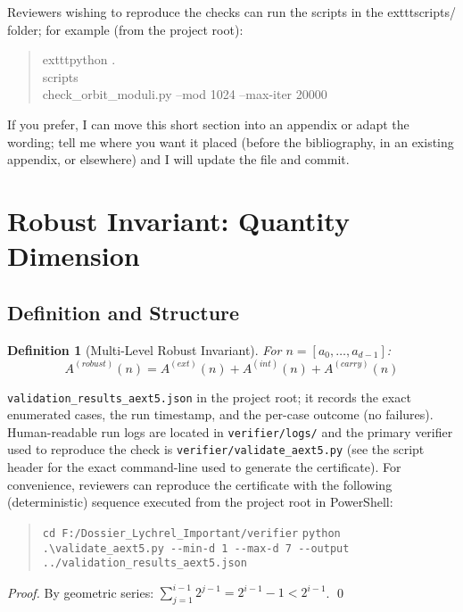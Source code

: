 \documentclass[12pt,a4paper]{article}
\newtheorem{definition}[theorem]{Definition}
\begin{document}
Reviewers wishing to reproduce the checks can run the scripts in the
	exttt{scripts/} folder; for example (from the project root):
\begin{quote}\small
	exttt{python .\\scripts\\check\_orbit\_moduli.py --mod 1024 --max-iter 20000}
\end{quote}

If you prefer, I can move this short section into an appendix or adapt the
wording; tell me where you want it placed (before the bibliography, in an
existing appendix, or elsewhere) and I will update the file and commit.

\section{Robust Invariant: Quantity Dimension}

\subsection{Definition and Structure}

\begin{definition}[Multi-Level Robust Invariant]\label{def:robust}
For $n = [a_0, \ldots, a_{d-1}]$:
$$A^{(robust)}(n) = A^{(ext)}(n) + A^{(int)}(n) + A^{(carry)}(n)$$
\end{definition} %
			\verb|validation_results_aext5.json|
in the project root; it records the exact enumerated cases, the run timestamp,
and the per-case outcome (no failures). Human-readable run logs are located in
		\texttt{verifier/logs/} and the primary verifier used to reproduce the check
is \verb|verifier/validate_aext5.py| (see the script header for the exact
command-line used to generate the certificate). For convenience, reviewers can
reproduce the certificate with the following (deterministic) sequence executed
from the project root in PowerShell:
\begin{quote}\small
	\verb|cd F:/Dossier_Lychrel_Important/verifier|
	\verb|python .\validate_aext5.py --min-d 1 --max-d 7 --output ../validation_results_aext5.json|
\end{quote}
\begin{proof}
By geometric series: $\sum_{j=1}^{i-1} 2^{j-1} = 2^{i-1} - 1 < 2^{i-1}$. \qed
\end{proof}
\end{document}
